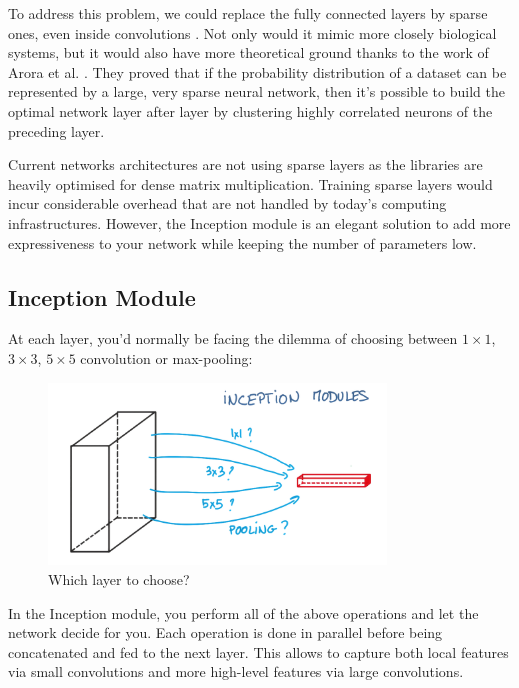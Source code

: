 To address this problem, we could replace the fully connected layers by sparse ones, even inside convolutions \cite{googlenet}. Not only would it mimic more closely biological systems, but it would also have more theoretical ground thanks to the work of Arora et al. \cite{arora}. They proved that if the probability distribution of a dataset can be represented by a large, very sparse neural network, then it's possible to build the optimal network layer after layer by clustering highly correlated neurons of the preceding layer.

Current networks architectures are not using sparse layers as the libraries are heavily optimised for dense matrix multiplication. Training sparse layers would incur considerable overhead that are not handled by today's computing infrastructures. However, the Inception module is an elegant solution to add more expressiveness to your network while keeping the number of parameters low. 

\subsection{Inception Module}
At each layer, you'd normally be facing the dilemma of choosing between $1\times 1$, $3\times 3$, $5\times5$ convolution or max-pooling:

\begin{figure}[H]
    \centering
    \includegraphics[width=0.8\textwidth]{Images/inceptionmodule.png}
    \caption{Which layer to choose? \cite{inceptionmodule}}
\end{figure}

In the Inception module, you perform all of the above operations and let the network decide for you. Each operation is done in parallel before being concatenated and fed to the next layer. This allows to capture both local features via small convolutions and more high-level features via large convolutions. 

